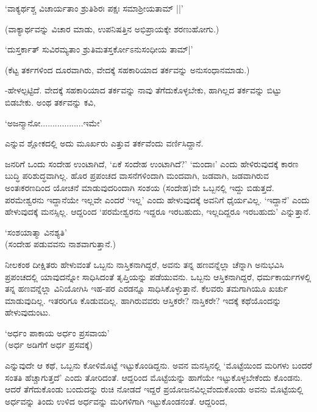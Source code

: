 \begin{shloka}
`ವಾಕ್ಯರ್ಥಶ್ಚ ವಿಚಾರ್ಯತಾಂ ಶ್ರುತಿಶಿರಃ ಪಕ್ಷಃ ಸಮಾಶ್ರೀಯತಾಮ್ ||'
\end{shloka}

(ವಾಕ್ಯಾರ್ಥವನ್ನು ವಿಚಾರ ಮಾಡು, ಉಪನಿಷತ್ತಿನ ಅಭಿಪ್ರಾಯಕ್ಕೇ ಶರಣುಹೋಗು.)

\begin{shloka}
`ದುಸ್ತರ್ಕಾತ್ ಸುವಿರಮ್ಯತಾಂ ಶ್ರುತಿಮತಸ್ತರ್ಕೋಽನುಸಂಧೀಯ ತಾಮ್|'
\end{shloka}

(ಕೆಟ್ಟ ತರ್ಕಗಳಿಂದ ದೂರವಾಗಿರು, ವೇದಕ್ಕೆ ಸಹಕಾರಿಯಾದ ತರ್ಕವನ್ನು ಅನುಸಂಧಾನಮಾಡು.)

-ಹೇಳಲ್ಪಟ್ಟಿದೆ. ವೇದಕ್ಕೆ ಸಹಕಾರಿಯಾದ ತರ್ಕವನ್ನು ನಾವು ತೆಗೆದುಕೊಳ್ಳಬೇಕು, ಹಾಗಿಲ್ಲದ ತರ್ಕವನ್ನು ಬಿಟ್ಟು ಬಿಡಬೇಕು. ಅಂಥ ತರ್ಕವನ್ನು ಕವಿ,

\begin{shloka}
`ಅಜನ್ಮಾನೋ..................ಇಮೇ'
\end{shloka}

ಎನ್ನುವ ಶ್ಲೋಕದಲ್ಲಿ ಅದು ಮೂರ್ಖರು ಎತ್ತುವ ತರ್ಕವೆಂದು ವರ್ಣಿಸಿದ್ದಾನೆ.

ಜನರಿಗೆ ಒಂದು ಸಂದೇಹ ಉಂಟಾಗಿದೆ, `ಏಕೆ ಸಂದೇಹ ಉಂಟಾಗಿದೆ?' `ಮಂದಾಃ' ಎಂದು ಹೇಳಿರುವುದಕ್ಕೆ ಕಾರಣ ಬುದ್ಧಿ ಪರಿಶುದ್ಧವಾಗಿಲ್ಲ. ಹೊರ ಪ್ರಪಂಚದ ವಾಸನೆಗಳಿಂದಾಗಿ ಮಂದವಾಗಿ, ಜಡವಾಗಿ, ಜಡವಾಗಿರುವ ಅಂತಃಕರಣದಿಂದ ಯೋಚನೆ ಮಾಡುವುದರಿಂದಾಗಿ ಸಂಶಯ (ಸಂದೇಹ)ವೇ ಒಬ್ಬನಲ್ಲಿ ಇದ್ದು ಬಿಡುತ್ತದೆ. ಪರಮೇಶ್ವರನು ಇದ್ದಾನೆಯೇ ಇಲ್ಲವೇ ಎಂದರೆ `ಇಲ್ಲ' ಎಂದು ಹೇಳುವುದಕ್ಕೆ ಅವನಿಗೆ ಧೈರ್ಯವಿಲ್ಲ. `ಇದ್ದಾನೆ' ಎಂದು ಹೇಳುವುದಕ್ಕೆ ಮನಸ್ಸಿಲ್ಲ. ಆದ್ದರಿಂದ `ಪರಮೇಶ್ವರನು ಇದ್ದರೂ ಇರಬಹುದು, ಇಲ್ಲದಿದ್ದರೂ ಇರಬಹುದು' ಎನ್ನುತ್ತಾನೆ.

\begin{shloka}
`ಸಂಶಯಾತ್ಮಾ ವಿನಶ್ಯತಿ'\\
(ಸಂದೇಹ ಪಡುವವನು ನಾಶವಾಗುತ್ತಾನೆ.)
\end{shloka}

ನೀಲಕಂಠ ದೀಕ್ಷಿತರು ಹೇಳುವಂತೆ ಒಬ್ಬನು ನಾಸ್ತಿಕನಾಗಿದ್ದರೆ, ಅವನು ತನ್ನ ಹಣವನ್ನೆಲ್ಲಾ ಚೆನ್ನಾಗಿ ಅನುಭವಿಸಿ ಪ್ರಪಂಚದಲ್ಲಿ ಯಾವುದನ್ನೋ ಸಾಧಿಸಿದಂತೆ ತೃಪ್ತಿಯನ್ನು ಪಡೆಯುವನು. ಒಬ್ಬನು ಆಸ್ತಿಕನಾಗಿದ್ದರೆ, ಧರ್ಮಕಾರ್ಯಗಳಲ್ಲಿ ತನ್ನ ಹಣವನ್ನೆಲ್ಲಾ ವಿನಿಯೋಗಿಸಿ ಇಹ-ಪರ ಎರಡನ್ನೂ ಸಾಧಿಸಿಕೊಳ್ಳುತ್ತಾನೆ. ಕೆಲವರು ತಮಗಾಗಿಯೂ ಖರ್ಚು ಮಾಡುವುದಿಲ್ಲ. ಇತರರಿಗೂ ಕೊಡುವದಿಲ್ಲ. ಹಾಗಿರುವವರು ಆಸ್ತಿಕರೇ? ನಾಸ್ತಿಕರೇ? ಇದಕ್ಕೆ ಕಥೆಯೊಂದನ್ನು ಹೇಳುವುದುಂಟು.

\begin{shloka}
`ಅರ್ಧಂ ಪಾಕಾಯ ಅರ್ಧಂ ಪ್ರಸವಾಯ'\\
(ಅರ್ಧ ಅಡಿಗೆಗೆ ಅರ್ಧ ಪ್ರಸವಕ್ಕೆ)
\end{shloka}

ಎನ್ನುವುದೇ ಆ ಕಥೆ, ಒಬ್ಬನು ಕೋಳಿಮೊಟ್ಟೆ ಇಟ್ಟುಕೊಂಡಿದ್ದನು. ಅವನ ಮನಸ್ಸಿನಲ್ಲಿ `ಮೊಟ್ಟೆಯಿಂದ ಮರಿಗಳು ಬಂದರೆ ಸಂತತಿ ಹೆಚ್ಚಾಗುತ್ತದೆ' ಎಂದು ತೋರಿದಂತೆ. ಆದ್ದರಿಂದ ಮೊಟ್ಟೆಯನ್ನು ಹಾಗೆಯೇ ಇಟ್ಟುಕೊಳ್ಳಬೇಕೆಂದು ಕೊಂಡನು. ಆದರೆ ತೆಗೆದುಕೊಂಡು ಬಂದುದನ್ನು ರುಚಿ ನೋಡದೆ ಇದ್ದರೆ ಪ್ರಯೋಜನವಿಲ್ಲವೆಂದುಕೊಂಡು ಅವನು ಮೊಟ್ಟೆಯಲ್ಲಿ ಅರ್ಧವನ್ನು ತಿಂದು ಉಳಿದ ಅರ್ಧವನ್ನು ಮರಿಗಳಿಗಾಗಿ ಇಟ್ಟುಕೊಂಡನಂತೆ. ಆದ್ದರಿಂದ,

